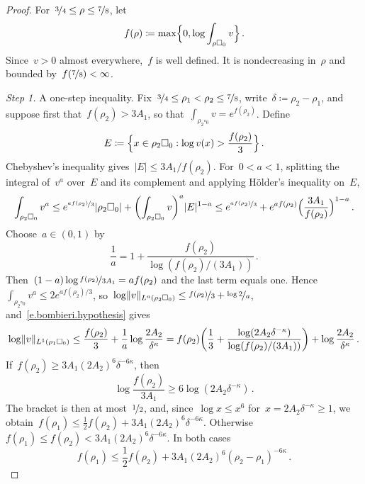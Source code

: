 \documentclass[11pt,letterpaper]{article}
\numberwithin{equation}{section}
\theoremstyle{definition}
\newcommand{\nf}{\nicefrac}
\newcommand{\cu}{\square}
\DeclarePairedDelimiter{\norm}{\lVert}{\rVert}
\begin{document}
\begin{proof}
For~$\nf34\leq\rho\leq\nf78$, let
\begin{equation*}
	f(\rho)\coloneqq\max\Bigl\{0,\log\int_{\rho\cu_0}v\Bigr\}\,.
\end{equation*}
Since~$v>0$ almost everywhere,~$f$ is well defined. It is nondecreasing in~$\rho$ and bounded by~$f(\nf78)<\infty$.

\smallskip

\emph{Step 1.} A one-step inequality. Fix~$\nf34\leq\rho_1<\rho_2\leq\nf78$, write~$\delta\coloneqq\rho_2-\rho_1$, and suppose first that~$f(\rho_2)>3A_1$, so that~$\int_{\rho_2\cu_0}v=e^{f(\rho_2)}$. Define
\begin{equation*}
	E\coloneqq\Bigl\{x\in\rho_2\cu_0:\log v(x)>\frac{f(\rho_2)}3\Bigr\}\,.
\end{equation*}
Chebyshev's inequality gives~$|E|\leq3A_1/f(\rho_2)$. For~$0<a<1$, splitting the integral of~$v^a$ over~$E$ and its complement and applying H\"older's inequality on~$E$,
\begin{equation*}
	\int_{\rho_2\cu_0}v^a\leq e^{\nf{af(\rho_2)}3}|\rho_2\cu_0|+\biggl(\int_{\rho_2\cu_0}v\biggr)^a|E|^{1-a}\leq e^{\nf{af(\rho_2)}3}+e^{af(\rho_2)}\Bigl(\frac{3A_1}{f(\rho_2)}\Bigr)^{1-a}\,.
\end{equation*}
Choose~$a\in(0,1)$ by
\begin{equation*}
	\frac1a=1+\frac{f(\rho_2)}{\log(f(\rho_2)/(3A_1))}\,.
\end{equation*}
Then~$(1-a)\log\nf{f(\rho_2)}{3A_1}=af(\rho_2)$ and the last term equals one. Hence~$\int_{\rho_2\cu_0}v^a\leq2e^{af(\rho_2)/3}$, so~$\log\norm{v}_{L^a(\rho_2\cu_0)}\leq\nf{f(\rho_2)}3+\nf{\log2}a$, and~\eqref{e.bombieri.hypothesis} gives
\begin{equation*}
	\log\norm{v}_{L^1(\rho_1\cu_0)}\leq\frac{f(\rho_2)}3+\frac1a\log\frac{2A_2}{\delta^\kappa}=f(\rho_2)\biggl(\frac13+\frac{\log(2A_2\delta^{-\kappa})}{\log(f(\rho_2)/(3A_1))}\biggr)+\log\frac{2A_2}{\delta^\kappa}\,.
\end{equation*}
If~$f(\rho_2)\geq3A_1(2A_2)^6\delta^{-6\kappa}$, then
\begin{equation*}
	\log\frac{f(\rho_2)}{3A_1}\geq6\log(2A_2\delta^{-\kappa})\,.
\end{equation*}
The bracket is then at most~$\nf12$, and, since~$\log x\leq x^6$ for~$x=2A_2\delta^{-\kappa}\geq1$, we obtain~$f(\rho_1)\leq\frac12f(\rho_2)+3A_1(2A_2)^6\delta^{-6\kappa}$. Otherwise~$f(\rho_1)\leq f(\rho_2)<3A_1(2A_2)^6\delta^{-6\kappa}$. In both cases
\begin{equation}
	f(\rho_1)\leq\frac12f(\rho_2)+3A_1(2A_2)^6(\rho_2-\rho_1)^{-6\kappa}\,.
	\label{e.bombieri.step}
\end{equation}


\end{proof}
\end{document}
